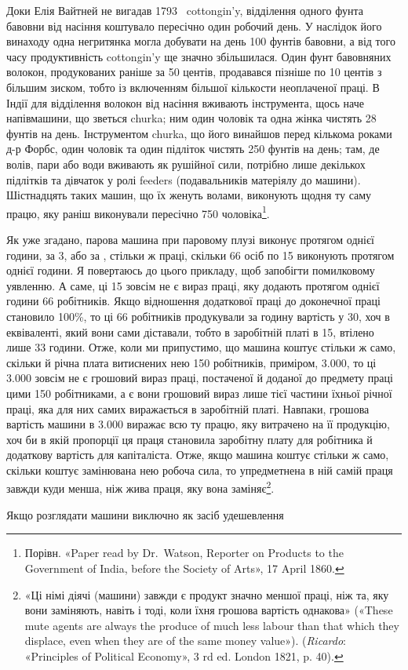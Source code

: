 \parcont{}  %
Доки Елія Вайтней не вигадав 1793~ cottongin’y, відділення одного
фунта бавовни від насіння коштувало пересічно один робочий
день. У наслідок його винаходу одна негритянка могла добувати
на день 100 фунтів бавовни, а від того часу продуктивність cottongin’y
ще значно збільшилася. Один фунт бавовняних волокон,
продукованих раніше за 50 центів, продавався пізніше по
10 центів з більшим зиском, тобто із включенням більшої кількости
неоплаченої праці. В Індії для відділення волокон від насіння
вживають інструмента, щось наче напівмашини, що зветься
churka; ним один чоловік та одна жінка чистять 28 фунтів на день.
Інструментом churka, що його винайшов перед кількома роками д-р Форбс, один
чоловік та один підліток чистять 250 фунтів на
день; там, де волів, пари або води вживають як рушійної сили,
потрібно лише декількох підлітків та дівчаток у ролі feeders
(подавальників матеріялу до машини). Шістнадцять таких машин,
що їх женуть волами, виконують щодня ту саму працю, яку раніш
виконували пересічно 750 чоловіка\footnote{
Порівн. «Paper read by Dr.~Watson, Reporter on Products to the
Government of India, before the Society of Arts», 17 April 1860.
}.

Як уже згадано, парова машина при паровому плузі виконує
протягом однієї години, за 3, або за , стільки ж
праці, скільки 66 осіб по 15 виконують протягом однієї
години. Я повертаюсь до цього прикладу, щоб запобігти помилковому
уявленню. А саме, ці 15 зовсім не є вираз праці, яку
додають протягом однієї години 66 робітників. Якщо відношення
додаткової праці до доконечної праці становило 100\%, то ці
66 робітників продукували за годину вартість у 30,
хоч в еквіваленті, який вони сами діставали, тобто в заробітній
платі в 15, втілено лише 33 години. Отже, коли ми припустимо,
що машина коштує стільки ж само, скільки й річна
плата витиснених нею 150 робітників, приміром, \num{3.000}, то ці \num{3.000} зовсім не є грошовий
вираз праці, постаченої й доданої до предмету праці цими 150 робітниками,
а є вони грошовий вираз лише тієї частини їхньої
річної праці, яка для них самих виражається в заробітній платі.
Навпаки, грошова вартість машини в \num{3.000}
виражає всю ту працю, яку витрачено на її продукцію, хоч би
в якій пропорції ця праця становила заробітну плату для
робітника й додаткову вартість для капіталіста. Отже, якщо
машина коштує стільки ж само, скільки коштує замінювана нею
робоча сила, то упредметнена в ній самій праця завжди куди
менша, ніж жива праця, яку вона заміняє\footnote{
«Ці німі діячі (машини) завжди є продукт значно меншої праці,
ніж та, яку вони заміняють, навіть і тоді, коли їхня грошова вартість
однакова» («These mute agents are always the produce of much less labour
than that which they displace, even when they are of the same money
value»). (\emph{Ricardo}: «Principles of Political Economy», 3 rd ed. London
1821, p. 40).
}.

Якщо розглядати машини виключно як засіб удешевлення
\parbreak{}  %
